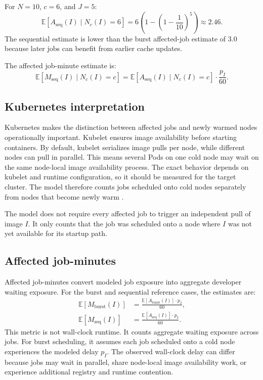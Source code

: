 \documentclass[11pt,a4paper]{article}
\newcommand{\E}{\mathbb{E}}
\begin{document}
For \(N=10\), \(c=6\), and \(J=5\):
\begin{equation}
\E[A_{\mathrm{seq}}(I)\mid N_c(I)=6]
=
6\left(1-\left(1-\frac{1}{10}\right)^5\right)
\approx
2.46.
\end{equation}
The sequential estimate is lower than the burst affected-job estimate of \(3.0\) because later jobs can benefit from earlier cache updates.

The affected job-minute estimate is:
\begin{equation}
\E[M_{\mathrm{seq}}(I)\mid N_c(I)=c]
=
\E[A_{\mathrm{seq}}(I)\mid N_c(I)=c]\cdot\frac{p_I}{60}.
\end{equation}

\subsection{Kubernetes interpretation}

Kubernetes makes the distinction between affected jobs and newly warmed nodes operationally important. Kubelet ensures image availability before starting containers. By default, kubelet serializes image pulls per node, while different nodes can pull in parallel. This means several Pods on one cold node may wait on the same node-local image availability process. The exact behavior depends on kubelet and runtime configuration, so it should be measured for the target cluster. The model therefore counts jobs scheduled onto cold nodes separately from nodes that become newly warm \cite{kubernetesimages}.

The model does not require every affected job to trigger an independent pull of image \(I\). It only counts that the job was scheduled onto a node where \(I\) was not yet available for its startup path.

\subsection{Affected job-minutes}

Affected job-minutes convert modeled job exposure into aggregate developer waiting exposure. For the burst and sequential reference cases, the estimates are:
\begin{align}
  \E[M_{\mathrm{burst}}(I)]
  &=
  \frac{\E[A_{\mathrm{burst}}(I)]\cdot p_I}{60}, \\
  \E[M_{\mathrm{seq}}(I)]
  &=
  \frac{\E[A_{\mathrm{seq}}(I)]\cdot p_I}{60}.
\end{align}
This metric is not wall-clock runtime. It counts aggregate waiting exposure across jobs. For burst scheduling, it assumes each job scheduled onto a cold node experiences the modeled delay \(p_I\). The observed wall-clock delay can differ because jobs may wait in parallel, share node-local image availability work, or experience additional registry and runtime contention.
\end{document}
